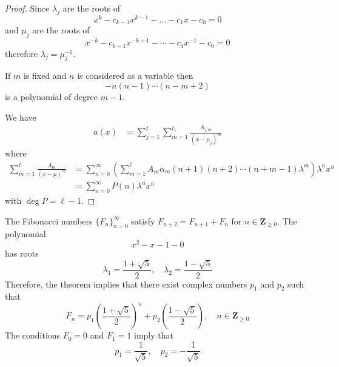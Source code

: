 \begin{proof}
Since $\lambda _{j}$ are the roots of 
$$
x^{k}-c_{k-1}x^{k-1}-\dots-c_{1}x-c_{0}=0
$$
and $\mu _{j}$ are the roots of
$$
x^{-k}-c_{k-1}x^{-k+1}-\cdots-c_{1}x ^{-1}-c_{0}=0
$$
therefore $\lambda _{j}=\mu _{j}^{-1}$.

If $m$ is fixed and $n$ is considered as a variable then
$$
-n(n-1)\cdots(n-m+2)
$$
is a polynomial of degree $m-1$.

We have
\begin{align*}
a(x) & =\sum_{j=1}^{t}\sum_{m=1}^{\ell _{t}} \frac{A_{j,m}}{(x-\mu _{j})^{m}} 
\end{align*}
where
\begin{align*}
\sum_{m=1}^{\ell} \frac{A_{m}}{(x-\mu )^{m} } & =\sum_{n=0}^{\infty} \left( \sum_{m=1}^{\ell} A_{m}\alpha _{m}(n+1)(n+2)\cdots (n+m-1)\lambda^{m}  \right) \lambda^{n}x^{n} \\
 & =\sum_{n=0}^{\infty} P(n)\lambda^{n}x^{n}
\end{align*}
with $\deg P=\ell -1$.
\end{proof}
\begin{example}
The Fibonacci numbers $\{ F_{n} \}_{n=0}^{\infty}$ satisfy $F_{n+2}=F_{n+1}+F_{n}$ for $n\in \mathbf{Z}_{\ge 0}$. The polynomial
$$
x^{2}-x-1-0
$$
has roots
$$
\lambda_{1}=\frac{1+\sqrt{ 5 }}{2},\quad \lambda_{2}=\frac{1-\sqrt{ 5 }}{2}
$$
Therefore, the theorem implies that there exist complex numbers $p_{1}$ and $p_{2}$ such that
$$
F_{n}=p_{1}\left( \frac{1+\sqrt{ 5 }}{2} \right)^{n}+p_{2}\left( \frac{1-\sqrt{ 5 }}{2} \right),\quad n\in \mathbf{Z}_{\ge 0}
$$
The conditions  $F_{0}=0$ and $F_{1}=1$ imply that
$$
p_{1}=\frac{1}{\sqrt{ 5 }},\quad p_{2}=-\frac{1}{\sqrt{ 5 }}
$$
\end{example}

